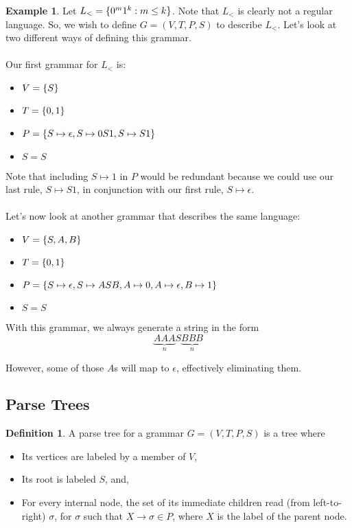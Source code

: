 \documentclass[]{article}
\DeclarePairedDelimiter{\set}{\lbrace}{\rbrace}
\theoremstyle{definition}
\newtheorem*{defn}{Definition}
\newtheorem{ex}{Example}[section]
\begin{document}
        \begin{ex}
          Let $L_< = \set{0^m 1^k : m \le k}$. Note that $L_<$ is clearly not a regular language. So, we wish to define $G = (V, T, P, S)$ to describe $L_<$. Let's look at two different ways of defining this grammar.
          \\ \\
          Our first grammar for $L_<$ is:
          \begin{itemize}
            \item $V = \set{S}$
            \item $T = \set{0, 1}$
            \item $P = \set{ S \mapsto \epsilon, S \mapsto 0S1, S \mapsto S1}$
            \item $S = S$
          \end{itemize}

          Note that including $S \mapsto 1$ in $P$ would be redundant because we could use our last rule, $S \mapsto S1$, in conjunction with our first rule, $S \mapsto \epsilon$.
          \\ \\
          Let's now look at another grammar that describes the same language:
          \begin{itemize}
            \item $V = \set{S, A, B}$
            \item $T = \set{0, 1}$
            \item $P = \set{S \mapsto \epsilon, S \mapsto ASB, A \mapsto 0, A \mapsto \epsilon, B \mapsto 1}$
            \item $S = S$
          \end{itemize}

          With this grammar, we always generate a string in the form
          $$
            \underbrace{AAA}_{n} S \underbrace{BBB}_{n}
          $$

          However, some of those $A$s will map to $\epsilon$, effectively eliminating them.
        \end{ex}

    \subsection{Parse Trees}
      \begin{defn}
        A parse tree for a grammar $G = (V, T, P, S)$ is a tree where
        \begin{itemize}
          \item Its vertices are labeled by a member of $V$,
          \item Its root is labeled $S$, and,
          \item For every internal node, the set of its immediate children read (from left-to-right) $\sigma$, for $\sigma$ such that $X \to \sigma \in P$, where $X$ is the label of the parent node.
        \end{itemize}
      \end{defn}
\end{document}
